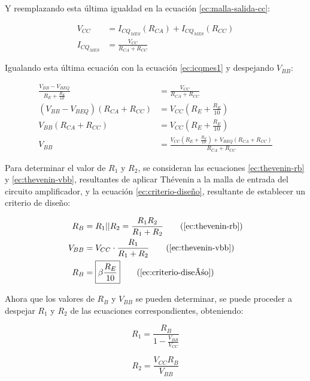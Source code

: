 Y reemplazando esta última igualdad en la ecuación \ref{ec:malla-salida-cc}:

\begin{align}
    V_{CC} &= I_{CQ_{MES}}(R_{CA}) + I_{CQ_{MES}}(R_{CC}) \nonumber\\
    I_{CQ_{MES}} &= \frac{V_{CC}}{R_{CA} + R_{CC}} \label{ec:icqmes2}
\end{align}

Igualando esta última ecuación con la ecuación \ref{ec:icqmes1} y despejando $V_{BB}$:

\begin{align}
   \frac{V_{BB} - V_{BEQ}} {R_E + \frac{R_E}{10}} &= \frac{V_{CC}}{R_{CA}+R_{CC}} \nonumber\\
   (V_{BB} - V_{BEQ})(R_{CA}+R_{CC}) &= V_{CC}(R_E +\frac{R_E}{10})\nonumber\\
   V_{BB}(R_{CA}+R_{CC}) &= V_{CC}(R_E +\frac{R_E}{10}) \nonumber\\
   V_{BB} &= \boxed{\frac{V_{CC}(R_E +\frac{R_E}{10}) + V_{BEQ}(R_{CA}+R_{CC})}{R_{CA}+R_{CC}}} \label{ec:calculo-vbb}
\end{align}

Para determinar el valor de $R_1$ y $R_2$, se consideran las ecuaciones \ref{ec:thevenin-rb} y \ref{ec:thevenin-vbb}, resultantes de aplicar Thévenin a la malla de entrada del circuito 
amplificador, y la ecuación \ref{ec:criterio-diseño},
resultante de establecer un criterio de diseño:

\begin{align*}
    R_B &= R_1||R_2=\frac{R_1 R_2}{R_1 + R_2} \tag{\ref{ec:thevenin-rb}}\\
    V_{BB} &= V_{CC} \cdot \frac{R_1}{R_1 + R_2} \tag{\ref{ec:thevenin-vbb}}\\
    R_B &= \boxed{\beta \frac{R_E}{10}} \tag{\ref{ec:criterio-diseño}}
\end{align*}

Ahora que los valores de $R_B$ y $V_{BB}$ se pueden determinar, se puede proceder a 
despejar $R_1$ y  $R_2$ de las ecuaciones correspondientes, obteniendo:

\begin{center}
    \begin{minipage}{0.2\textwidth}
    \begin{equation*}
        \boxed{R_1 = \frac{R_B}{1-\frac{V_{BB}}{V_{CC}}}}
    \end{equation*}
    \end{minipage}
    \begin{minipage}{0.2\textwidth}
    \begin{equation*}
        \boxed{R_2 = \frac{V_{CC}R_B}{V_{BB}}}
    \end{equation*}
    \end{minipage}
\end{center}


